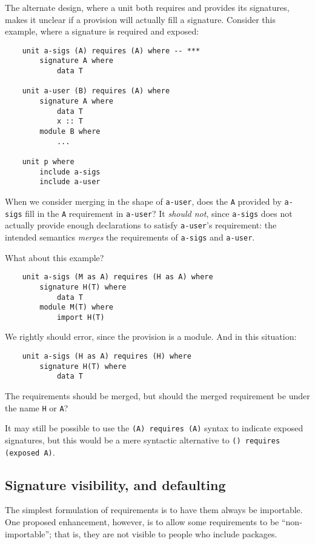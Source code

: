 \documentclass{article}
\begin{document}
The alternate design, where a unit both requires and provides
its signatures, makes it unclear if a provision
will actually fill a signature.  Consider this example, where
a signature is required and exposed:

\begin{verbatim}
    unit a-sigs (A) requires (A) where -- ***
        signature A where
            data T

    unit a-user (B) requires (A) where
        signature A where
            data T
            x :: T
        module B where
            ...

    unit p where
        include a-sigs
        include a-user
\end{verbatim}
%
When we consider merging in the shape of \verb|a-user|, does the
\verb|A| provided by \verb|a-sigs| fill in the \verb|A| requirement
in \verb|a-user|?  It \emph{should not}, since \verb|a-sigs| does not
actually provide enough declarations to satisfy \verb|a-user|'s
requirement: the intended semantics \emph{merges} the requirements
of \verb|a-sigs| and \verb|a-user|.

What about this example?

\begin{verbatim}
    unit a-sigs (M as A) requires (H as A) where
        signature H(T) where
            data T
        module M(T) where
            import H(T)
\end{verbatim}
%
We rightly should error, since the provision is a module. And in this situation:

\begin{verbatim}
    unit a-sigs (H as A) requires (H) where
        signature H(T) where
            data T
\end{verbatim}
%
The requirements should be merged, but should the merged requirement
be under the name \verb|H| or \verb|A|?

It may still be possible to use the \verb|(A) requires (A)| syntax to
indicate exposed signatures, but this would be a mere syntactic
alternative to \verb|() requires (exposed A)|.

\subsection{Signature visibility, and defaulting}
The simplest formulation of requirements is to have them always be
importable.  One proposed enhancement, however, is to allow some
requirements to be ``non-importable''; that is, they are not visible
to people who include packages.
\end{document}
